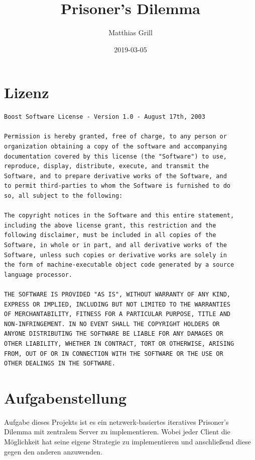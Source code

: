 \documentclass[12pt, letterpaper]{article}
\title{Prisoner's Dilemma}
\author{Matthias Grill}
\date{2019-03-05}
\begin{document}
	
\maketitle
\newpage

\tableofcontents
\newpage


\section{Lizenz}
\begin{Verbatim}
Boost Software License - Version 1.0 - August 17th, 2003

Permission is hereby granted, free of charge, to any person or
organization obtaining a copy of the software and accompanying
documentation covered by this license (the "Software") to use,
reproduce, display, distribute, execute, and transmit the
Software, and to prepare derivative works of the Software, and
to permit third-parties to whom the Software is furnished to do
so, all subject to the following:

The copyright notices in the Software and this entire statement,
including the above license grant, this restriction and the
following disclaimer, must be included in all copies of the
Software, in whole or in part, and all derivative works of the
Software, unless such copies or derivative works are solely in
the form of machine-executable object code generated by a source
language processor.

THE SOFTWARE IS PROVIDED "AS IS", WITHOUT WARRANTY OF ANY KIND,
EXPRESS OR IMPLIED, INCLUDING BUT NOT LIMITED TO THE WARRANTIES
OF MERCHANTABILITY, FITNESS FOR A PARTICULAR PURPOSE, TITLE AND
NON-INFRINGEMENT. IN NO EVENT SHALL THE COPYRIGHT HOLDERS OR
ANYONE DISTRIBUTING THE SOFTWARE BE LIABLE FOR ANY DAMAGES OR
OTHER LIABILITY, WHETHER IN CONTRACT, TORT OR OTHERWISE, ARISING
FROM, OUT OF OR IN CONNECTION WITH THE SOFTWARE OR THE USE OR
OTHER DEALINGS IN THE SOFTWARE.
\end{Verbatim}

\clearpage

\normalsize

\newpage

\section{Aufgabenstellung}
Aufgabe dieses Projekts ist es ein netzwerk-basiertes iteratives Prisoner's Dilemma mit zentralem Server zu implementieren. Wobei jeder Client die Möglichkeit hat seine eigene Strategie zu implementieren und anschließend diese gegen den anderen anzuwenden.
\end{document}
